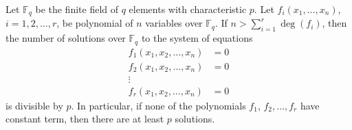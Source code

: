 \documentclass[12pt]{article}
\begin{document}
Let $\mathbb{F}_q$ be the finite field of $q$ elements with
characteristic $p$. Let $f_i(x_1,\ldots, x_n)$, $i=1,2,\ldots, r$,
be polynomial of $n$ variables over $\mathbb{F}_q$. If $n >
\sum_{i=1}^r \deg(f_i)$, then the number of solutions over
$\mathbb{F}_q$ to the system of equations
\begin{align*}
f_1(x_1,x_2,\ldots, x_n) &=0\\
f_2(x_1,x_2,\ldots, x_n) &=0\\
\vdots & \\
f_r(x_1,x_2,\ldots, x_n) &=0
\end{align*}
is divisible by $p$. In particular, if none of the polynomials
$f_1$, $f_2,\ldots, f_r$ have constant term, then there are at least
$p$ solutions.
\end{document}
